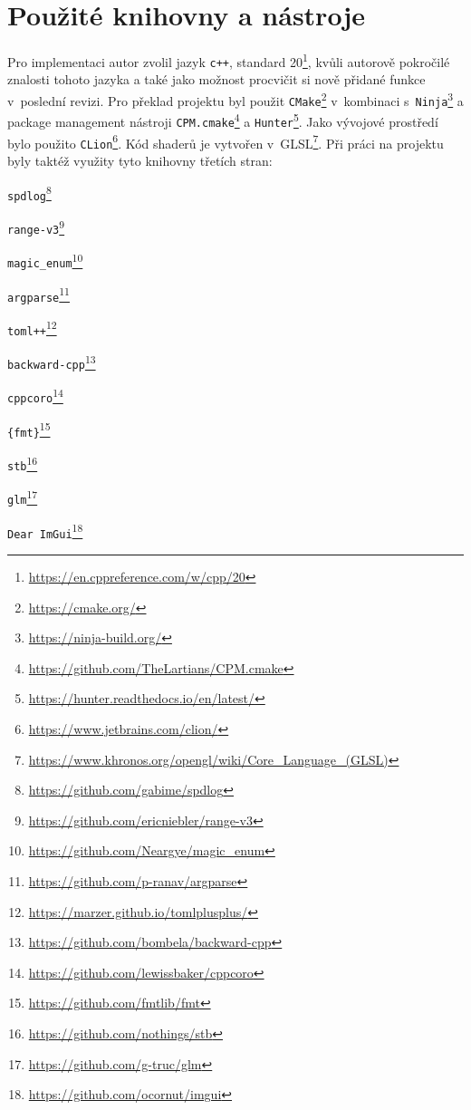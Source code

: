 \section{Použité knihovny a nástroje}
Pro implementaci autor zvolil jazyk \texttt{c++}, standard 20\footnote{\url{https://en.cppreference.com/w/cpp/20}}, kvůli autorově pokročilé znalosti tohoto jazyka a také jako možnost procvičit si nově přidané funkce v~poslední revizi. Pro překlad projektu byl použit \texttt{CMake}\footnote{\url{https://cmake.org/}} v~kombinaci s~\texttt{Ninja}\footnote{\url{https://ninja-build.org/}} a package management nástroji \texttt{CPM.cmake}\footnote{\url{https://github.com/TheLartians/CPM.cmake}} a \texttt{Hunter}\footnote{\url{https://hunter.readthedocs.io/en/latest/}}. Jako vývojové prostředí bylo použito \texttt{CLion}\footnote{\url{https://www.jetbrains.com/clion/}}. Kód shaderů je vytvořen v~GLSL\footnote{\url{https://www.khronos.org/opengl/wiki/Core_Language_(GLSL)}}. Při práci na projektu byly taktéž využity tyto knihovny třetích stran:

\begin{itemize}
\end{itemize}

